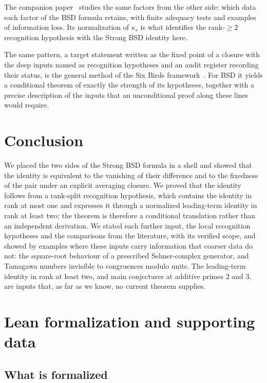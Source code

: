\documentclass[11pt]{article}
\theoremstyle{definition}
\newcommand{\kapr}{\kappa_r}
\begin{document}
The companion paper~\citep{TsiokosBSDApparatus2026} studies the same
factors from the other side: which data each factor of the BSD formula
retains, with finite adequacy tests and examples of information loss.
Its normalization of $\kapr$ is what identifies the rank-$\ge2$
recognition hypothesis with the Strong BSD identity here.

The same pattern, a target statement written as the fixed point of a
closure with the deep inputs named as recognition hypotheses and an
audit register recording their status, is the general method of the Six
Birds framework~\citep{TsiokosFoundationsIII2026,TsiokosAOR2026}.  For BSD
it yields a conditional theorem of exactly the strength of its
hypotheses, together with a precise description of the inputs that an
unconditional proof along these lines would require.
 \section{Conclusion}\label{sec:conclusion}


We placed the two sides of the Strong BSD formula in a shell and showed
that the identity is equivalent to the vanishing of their difference and
to the fixedness of the pair under an explicit averaging closure.  We
proved that the identity follows from a rank-split recognition
hypothesis, which contains the identity in rank at most one and
expresses it through a normalized leading-term identity in rank at least
two; the theorem is therefore a conditional translation rather than an
independent derivation.  We stated each further input, the local
recognition hypotheses and the comparisons from the literature, with its
verified scope, and showed by examples where these inputs carry
information that coarser data do not: the square-root behaviour of a
prescribed Selmer-complex generator, and Tamagawa numbers invisible to
congruences modulo units.  The leading-term identity in rank at least two,
and main conjectures at additive primes $2$ and $3$, are inputs that, as
far as we know, no current theorem supplies.
 \appendix
{}
\section{Lean formalization and supporting data}\label{app:formalization}

\subsection*{What is formalized}
\end{document}
